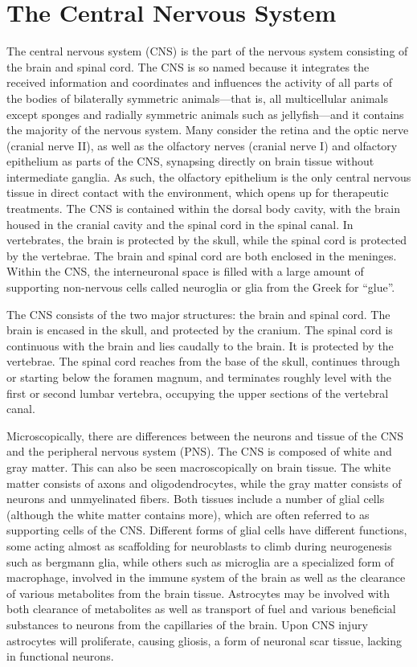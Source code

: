 \documentclass[]{book}
\begin{document}
\hypertarget{the-central-nervous-system}{%
\chapter{The Central Nervous System}\label{the-central-nervous-system}}

The central nervous system (CNS) is the part of the nervous system consisting of the brain and spinal cord. The CNS is so named because it integrates the received information and coordinates and influences the activity of all parts of the bodies of bilaterally symmetric animals---that is, all multicellular animals except sponges and radially symmetric animals such as jellyfish---and it contains the majority of the nervous system. Many consider the retina and the optic nerve (cranial nerve II), as well as the olfactory nerves (cranial nerve I) and olfactory epithelium as parts of the CNS, synapsing directly on brain tissue without intermediate ganglia. As such, the olfactory epithelium is the only central nervous tissue in direct contact with the environment, which opens up for therapeutic treatments. The CNS is contained within the dorsal body cavity, with the brain housed in the cranial cavity and the spinal cord in the spinal canal. In vertebrates, the brain is protected by the skull, while the spinal cord is protected by the vertebrae. The brain and spinal cord are both enclosed in the meninges. Within the CNS, the interneuronal space is filled with a large amount of supporting non-nervous cells called neuroglia or glia from the Greek for ``glue''.

The CNS consists of the two major structures: the brain and spinal cord. The brain is encased in the skull, and protected by the cranium. The spinal cord is continuous with the brain and lies caudally to the brain. It is protected by the vertebrae. The spinal cord reaches from the base of the skull, continues through or starting below the foramen magnum, and terminates roughly level with the first or second lumbar vertebra, occupying the upper sections of the vertebral canal.

Microscopically, there are differences between the neurons and tissue of the CNS and the peripheral nervous system (PNS). The CNS is composed of white and gray matter. This can also be seen macroscopically on brain tissue. The white matter consists of axons and oligodendrocytes, while the gray matter consists of neurons and unmyelinated fibers. Both tissues include a number of glial cells (although the white matter contains more), which are often referred to as supporting cells of the CNS. Different forms of glial cells have different functions, some acting almost as scaffolding for neuroblasts to climb during neurogenesis such as bergmann glia, while others such as microglia are a specialized form of macrophage, involved in the immune system of the brain as well as the clearance of various metabolites from the brain tissue. Astrocytes may be involved with both clearance of metabolites as well as transport of fuel and various beneficial substances to neurons from the capillaries of the brain. Upon CNS injury astrocytes will proliferate, causing gliosis, a form of neuronal scar tissue, lacking in functional neurons.
\end{document}
